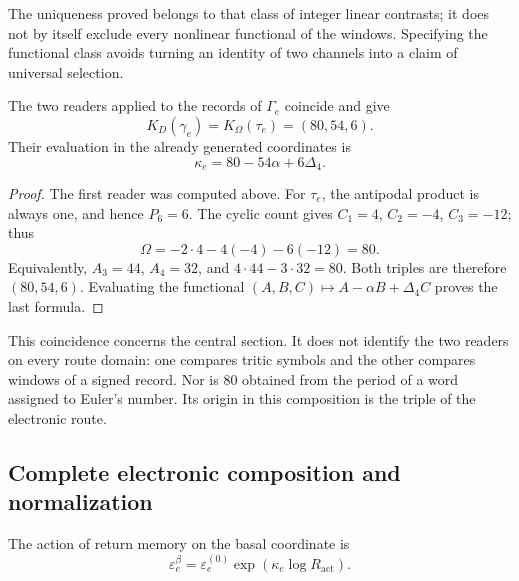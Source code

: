 The uniqueness proved belongs to that class of integer linear
contrasts; it does not by itself exclude every nonlinear functional of the windows.
Specifying the functional class avoids turning an identity
of two channels into a claim of universal selection.

\begin{theorem}
The two readers applied to the records of \(\Gamma_e\)
coincide and give
\begin{equation}
 K_D(\gamma_e)=K_\Omega(\tau_e)=(80,54,6).
 \label{eq:el-triple}
\end{equation}
Their evaluation in the already generated coordinates is
\begin{equation}
 \kappa_e=80-54\alpha+6\Delta_4.
 \label{eq:el-kappa}
\end{equation}
\end{theorem}
\begin{proof}
The first reader was computed above. For \(\tau_e\), the antipodal
product is always one, and hence \(P_6=6\). The cyclic count gives
\(C_1=4\), \(C_2=-4\), \(C_3=-12\); thus
\[
 \Omega=-2\cdot4-4(-4)-6(-12)=80.
\]
Equivalently, \(A_3=44\), \(A_4=32\), and
\(4\cdot44-3\cdot32=80\). Both triples are therefore
\((80,54,6)\). Evaluating the functional
\((A,B,C)\mapsto A-\alpha B+\Delta_4C\) proves the last formula.
\end{proof}

This coincidence concerns the central section. It does not identify
the two readers on every route domain: one compares tritic
symbols and the other compares windows of a signed record. Nor is
\(80\) obtained from the period of a word assigned to Euler's
number. Its origin in this composition is the triple of the electronic
route.



\subsection{Complete electronic composition and normalization}

\begin{definition}
The action of return memory on the basal coordinate is
\begin{equation}
 \varepsilon_e^\beta
 =\varepsilon_e^{(0)}\exp\!\left(\kappa_e\log R_{\mathrm{act}}\right).
 \label{eq:el-beta}
\end{equation}
\end{definition}

